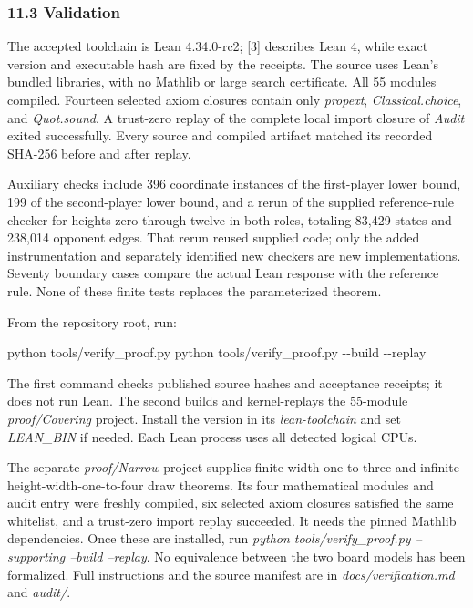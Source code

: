 \documentclass[
  a4paper,
]{article}
\newenvironment{Shaded}{}{}
\newcommand{\AttributeTok}[1]{\textcolor[rgb]{0.49,0.56,0.16}{#1}}
\newcommand{\ExtensionTok}[1]{#1}
\newcommand{\NormalTok}[1]{#1}
\begin{document}
\subsubsection{11.3 Validation}\label{validation}

The accepted toolchain is Lean 4.34.0-rc2; {[}3{]} describes Lean 4,
while exact version and executable hash are fixed by the receipts. The
source uses Lean's bundled libraries, with no Mathlib or large search
certificate. All 55 modules compiled. Fourteen selected axiom closures
contain only \emph{propext}, \emph{Classical.choice}, and
\emph{Quot.sound}. A trust-zero replay of the complete local import
closure of \emph{Audit} exited successfully. Every source and compiled
artifact matched its recorded SHA-256 before and after replay.

Auxiliary checks include 396 coordinate instances of the first-player
lower bound, 199 of the second-player lower bound, and a rerun of the
supplied reference-rule checker for heights zero through twelve in both
roles, totaling 83,429 states and 238,014 opponent edges. That rerun
reused supplied code; only the added instrumentation and separately
identified new checkers are new implementations. Seventy boundary cases
compare the actual Lean response with the reference rule. None of these
finite tests replaces the parameterized theorem.

From the repository root, run:

\begin{Shaded}
\begin{Highlighting}[]
\ExtensionTok{python}\NormalTok{ tools/verify\_proof.py}
\ExtensionTok{python}\NormalTok{ tools/verify\_proof.py }\AttributeTok{{-}{-}build} \AttributeTok{{-}{-}replay}
\end{Highlighting}
\end{Shaded}

The first command checks published source hashes and acceptance
receipts; it does not run Lean. The second builds and kernel-replays the
55-module \emph{proof/Covering} project. Install the version in its
\emph{lean-toolchain} and set \emph{LEAN\_BIN} if needed. Each Lean
process uses all detected logical CPUs.

The separate \emph{proof/Narrow} project supplies
finite-width-one-to-three and infinite-height-width-one-to-four draw
theorems. Its four mathematical modules and audit entry were freshly
compiled, six selected axiom closures satisfied the same whitelist, and
a trust-zero import replay succeeded. It needs the pinned Mathlib
dependencies. Once these are installed, run \emph{python
tools/verify\_proof.py --supporting --build --replay}. No equivalence
between the two board models has been formalized. Full instructions and
the source manifest are in \emph{docs/verification.md} and
\emph{audit/}.
\end{document}
